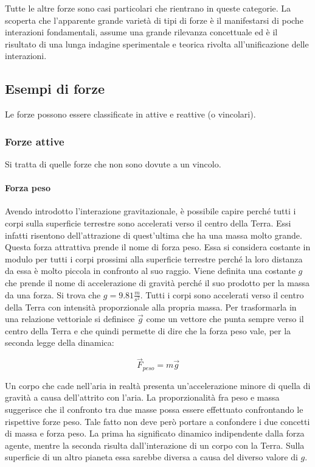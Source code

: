 Tutte le altre forze sono casi particolari che rientrano in queste categorie. La scoperta che l'apparente grande varietà di tipi di forze è il manifestarsi di poche interazioni fondamentali, assume una grande rilevanza concettuale ed è il risultato di una lunga indagine sperimentale e teorica rivolta all'unificazione delle interazioni.

\subsection{Esempi di forze}

Le forze possono essere classificate in attive e reattive (o vincolari).

\subsubsection{Forze attive}

Si tratta di quelle forze che non sono dovute a un vincolo.

\paragraph{Forza peso} Avendo introdotto l'interazione gravitazionale, è possibile capire perché tutti i corpi sulla superficie terrestre sono accelerati verso il centro della Terra. Essi infatti risentono dell'attrazione di quest'ultima che ha una massa molto grande. Questa forza attrattiva prende il nome di forza peso. Essa si considera costante in modulo per tutti i corpi prossimi alla superficie terrestre perché la loro distanza da essa è molto piccola in confronto al suo raggio. Viene definita una costante $g$ che prende il nome di accelerazione di gravità perché il suo prodotto per la massa da una forza. Si trova che $g=9.81 \frac{m}{s^2}$. Tutti i corpi sono accelerati verso il centro della Terra con intensità proporzionale alla propria massa. Per trasformarla in una relazione vettoriale si definisce $\vec{g}$ come un vettore che punta sempre verso il centro della Terra e che quindi permette di dire che la forza peso vale, per la seconda legge della dinamica:

\[
	\vec{F}_{peso}=m\vec{g}
\]

Un corpo che cade nell'aria in realtà presenta un'accelerazione minore di quella di gravità a causa dell'attrito con l'aria. La proporzionalità fra peso e massa suggerisce che il confronto tra due masse possa essere effettuato confrontando le rispettive forze peso. Tale fatto non deve però portare a confondere i due concetti di massa e forza peso. La prima ha significato dinamico indipendente dalla forza agente, mentre la seconda risulta dall'interazione di un corpo con la Terra. Sulla superficie di un altro pianeta essa sarebbe diversa a causa del diverso valore di $g$.

